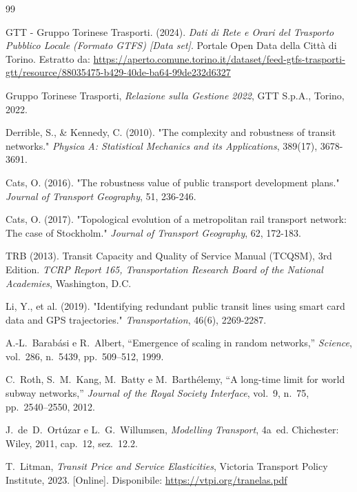 \documentclass[conference]{IEEEtran}
\begin{document}
\begin{thebibliography}{99}

GTT - Gruppo Torinese Trasporti. (2024). \textit{Dati di Rete e Orari del Trasporto Pubblico Locale (Formato GTFS) [Data set]}. Portale Open Data della Città di Torino. Estratto da: \url{https://aperto.comune.torino.it/dataset/feed-gtfs-trasporti-gtt/resource/88035475-b429-40de-ba64-99de232d6327}

Gruppo Torinese Trasporti,
\textit{Relazione sulla Gestione 2022},
GTT S.p.A., Torino, 2022.

Derrible, S., \& Kennedy, C. (2010). "The complexity and robustness of transit networks." \textit{Physica A: Statistical Mechanics and its Applications}, 389(17), 3678-3691.

Cats, O. (2016). "The robustness value of public transport development plans." \textit{Journal of Transport Geography}, 51, 236-246.

Cats, O. (2017). "Topological evolution of a metropolitan rail transport network: The case of Stockholm." \emph{Journal of Transport Geography}, 62, 172-183.

TRB (2013). Transit Capacity and Quality of Service Manual (TCQSM), 3rd Edition. \textit{TCRP Report 165, Transportation Research Board of the National Academies}, Washington, D.C.

Li, Y., et al. (2019). "Identifying redundant public transit lines using smart card data and GPS trajectories." \emph{Transportation}, 46(6), 2269-2287.

A.-L.~Barabási e R.~Albert,
``Emergence of scaling in random networks,''
\textit{Science}, vol.~286, n.~5439, pp.~509--512, 1999.

C.~Roth, S.~M.~Kang, M.~Batty e M.~Barthélemy,
``A long-time limit for world subway networks,''
\textit{Journal of the Royal Society Interface},
vol.~9, n.~75, pp.~2540--2550, 2012.

J.~de~D.~Ortúzar e L.~G.~Willumsen,
\textit{Modelling Transport}, 4a~ed.
Chichester: Wiley, 2011, cap.~12, sez.~12.2.

T.~Litman,
\textit{Transit Price and Service Elasticities},
Victoria Transport Policy Institute, 2023.
[Online]. Disponibile: \url{https://vtpi.org/tranelas.pdf}


\end{thebibliography}
\end{document}
